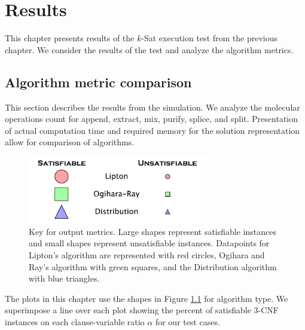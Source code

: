 \chapter{Results}

This chapter presents results of the $k$-{\sc Sat} execution test from the previous chapter.  We consider the results of the test and analyze the algorithm metrics. 

	\section{Algorithm metric comparison}
	
This section describes the results from the simulation.  We analyze the molecular operations count for append, extract, mix, purify, splice, and split.  Presentation of actual computation time and required memory for the solution representation allow for comparison of algorithms.

\begin{figure}[htdp]

\begin{center}

\includegraphics[width=0.7\textwidth]{./figures/key.pdf}

\caption{Key for output metrics.  Large shapes represent satisfiable instances and small shapes represent unsatisfiable instances.  Datapoints for Lipton's algorithm are represented with red circles, Ogihara and Ray's algorithm with green squares, and the Distribution algorithm with blue triangles. }
\label{metricKey}
\end{center}
\end{figure}

\FloatBarrier

\newpage
The plots in this chapter use the shapes in Figure \ref{metricKey} for algorithm type.  We superimpose a line over each plot showing the percent of satisfiable $3$-CNF instances on each clause-variable ratio $\alpha$ for our test cases.


